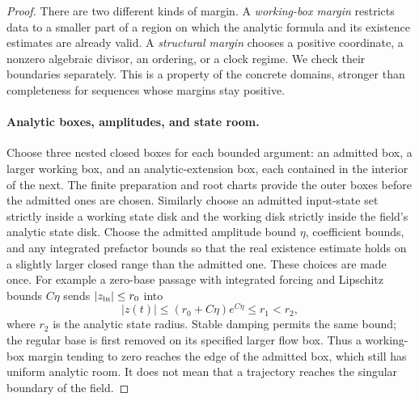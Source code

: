 \begin{proof}
There are two different kinds of margin.  A \emph{working-box margin}
restricts data to a smaller part of a region on which the analytic formula
and its existence estimates are already valid.  A \emph{structural margin}
chooses a positive coordinate, a nonzero algebraic divisor, an ordering,
or a clock regime.  We check their boundaries separately.  This is a
property of the concrete domains, stronger than completeness for sequences
whose margins stay positive.

\paragraph{Analytic boxes, amplitudes, and state room.}
Choose three nested closed boxes for each bounded argument: an admitted
box, a larger working box, and an analytic-extension box, each contained in
the interior of the next.  The finite preparation and root charts provide
the outer boxes before the admitted ones are chosen.  Similarly choose
an admitted input-state set strictly inside a working state disk and the
working disk strictly inside the field's analytic state disk.  Choose the
admitted amplitude bound \(\eta\), coefficient bounds, and any integrated
prefactor bounds so that the real existence estimate holds on a slightly
larger closed range than the admitted one.  These choices are made once.
For example a zero-base passage with integrated forcing and Lipschitz
bounds \(C\eta\) sends \(|z_{\rm in}|\le r_0\) into
\[
 |z(t)|\le (r_0+C\eta)e^{C\eta}\le r_1<r_2,
\]
where \(r_2\) is the analytic state radius.  Stable damping permits the
same bound; the regular base is first removed on its specified larger
flow box.  Thus a working-box margin tending to zero reaches the edge of
the admitted box, which still has uniform analytic room.  It does not
mean that a trajectory reaches the singular boundary of the field.


\end{proof}
